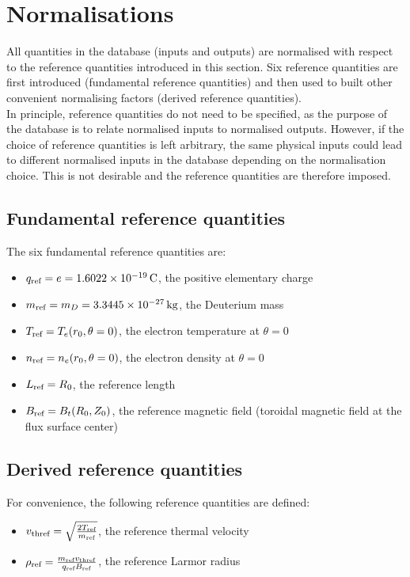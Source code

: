 \documentclass[fleqn]{report}
\begin{document}
\section{Normalisations}
All quantities in the database (inputs and outputs) are normalised with respect to the reference quantities introduced in this section. Six reference quantities are first introduced (fundamental reference quantities) and then used to built other convenient normalising factors (derived reference quantities).\\
In principle, reference quantities do not need to be specified, as the purpose of the database is to relate normalised inputs to normalised outputs. 
However, if the choice of reference quantities is left arbitrary, the same physical inputs could lead to different normalised inputs in the database depending on the normalisation choice. This is not desirable and the reference quantities are therefore imposed. 

\subsection{Fundamental reference quantities}
The six fundamental reference quantities are:
\begin{itemize}
\item $q_{\textrm{ref}}=e=1.6022\times10^{-19}\,\textrm{C}$, the positive elementary charge
\item $m_{\textrm{ref}}=m_D=3.3445\times10^{-27}\,\textrm{kg}$, the Deuterium mass
\item $T_{\textrm{ref}}=T_e(r_0,\theta=0)$, the electron temperature at $\theta=0$
\item $n_{\textrm{ref}}=n_e(r_0,\theta=0)$, the electron density at $\theta=0$
\item $L_{\textrm{ref}}=R_0$, the reference length
\item $B_{\textrm{ref}}=B_t(R_0,Z_0)$, the reference magnetic field (toroidal magnetic field at the flux surface center)
\end{itemize}

\subsection{Derived reference quantities}
For convenience, the following reference quantities are defined:
\begin{itemize}
\item $v_\textrm{thref}=\sqrt{\frac{2T_{\textrm{ref}}}{m_{\textrm{ref}}}}$, the reference thermal velocity
\item $\rho_{\textrm{ref}} = \frac{m_{\textrm{ref}} v_\textrm{thref}}{q_{\textrm{ref}} B_{\textrm{ref}}}$, the reference Larmor radius
\end{itemize}
\end{document}
